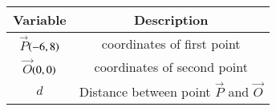 \begin{tabular}[12pt]{ |c| c| }
    \hline
	\textbf{Variable}  & \textbf{Description}  \\
    \hline
	$\vec{P}$$\left(-6,8\right)$ &  coordinates of first point  \\
    \hline 
	$\vec{O}$$\left(0,0\right)$ & coordinates of second point\\
    \hline
    	$d$ & Distance between point $\vec P$ and $\vec O$\\
    \hline 
             
\end{tabular}
